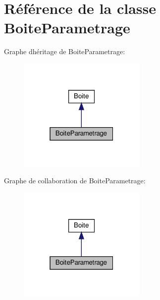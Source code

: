 \hypertarget{classBoiteParametrage}{}\section{Référence de la classe Boite\+Parametrage}
\label{classBoiteParametrage}


Graphe d\textquotesingle{}héritage de Boite\+Parametrage\+:
\nopagebreak
\begin{figure}[H]
\begin{center}
\leavevmode
\includegraphics[width=175pt]{classBoiteParametrage__inherit__graph}
\end{center}
\end{figure}


Graphe de collaboration de Boite\+Parametrage\+:
\nopagebreak
\begin{figure}[H]
\begin{center}
\leavevmode
\includegraphics[width=175pt]{classBoiteParametrage__coll__graph}
\end{center}
\end{figure}
